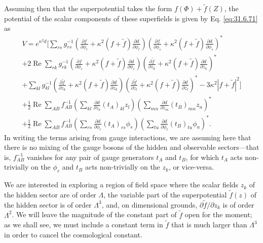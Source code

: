 Assuming then that the superpotential takes the form
\(f(\Phi)+\widetilde f(Z)\), the potential of the scalar components of these
superfields is given by Eq. \eqref{eq:31.6.71} as
\begin{multline}
  V=e^{\kappa^2d}\Biggl[
  \sum_{rs}g_{rs}^{-1}
  \left(
    \frac{\partial f}{\partial\phi_r}
    +\kappa^2(f+\widetilde f)\frac{\partial d}{\partial\phi_r}
  \right)
  \left(
    \frac{\partial f}{\partial\phi_s}
    +\kappa^2(f+\widetilde f)\frac{\partial d}{\partial\phi_s}
  \right)^*
  \\
  +2\operatorname{Re}\sum_{rk}g_{rk}^{-1}
  \left(
    \frac{\partial f}{\partial\phi_r}
    +\kappa^2(f+\widetilde f)\frac{\partial d}{\partial\phi_r}
  \right)
  \left(
    \frac{\partial\widetilde f}{\partial z_k}
    +\kappa^2(f+\widetilde f)\frac{\partial d}{\partial z_k}
  \right)^*
  \\
  +\sum_{kl}g_{kl}^{-1}
  \left(
    \frac{\partial\widetilde f}{\partial z_k}
    +\kappa^2(f+\widetilde f)\frac{\partial d}{\partial z_k}
  \right)
  \left(
    \frac{\partial\widetilde f}{\partial z_l}
    +\kappa^2(f+\widetilde f)\frac{\partial d}{\partial z_l}
  \right)^*
  -3\kappa^2|f+\widetilde f|^2
  \Biggr]
  \\
  +\frac12\operatorname{Re}\sum_{AB}f_{AB}^{-1}
  \left(
    \sum_{kl}\frac{\partial d}{\partial z_k}(t_A)_{kl}z_l
  \right)
  \left(
    \sum_{mn}\frac{\partial d}{\partial z_m}(t_B)_{mn}z_n
  \right)^*
  \\
  +\frac12\operatorname{Re}\sum_{AB}f_{AB}^{-1}
  \left(
    \sum_{rs}\frac{\partial d}{\partial\phi_r}(t_A)_{rs}\phi_s
  \right)
  \left(
    \sum_{tu}\frac{\partial d}{\partial\phi_t}(t_B)_{tu}\phi_u
  \right)^* .
  \tag{31.7.2}\label{eq:31.7.2}
\end{multline}
In writing the terms arising from gauge interactions, we are assuming here
that there is no mixing of the gauge bosons of the hidden and observable
sectors---that is, \(f_{AB}^{-1}\) vanishes for any pair of gauge generators
\(t_A\) and \(t_B\), for which \(t_A\) acts non-trivially on the \(\phi_r\)
and \(t_B\) acts non-trivially on the \(z_k\), or vice-versa.

We are interested in exploring a region of field space where the scalar
fields \(z_k\) of the hidden sector are of order \(\Lambda\), the variable
part of the superpotential \(\widetilde f(z)\) of the hidden sector is of
order \(\Lambda^3\), and, on dimensional grounds,
\(\partial\widetilde f/\partial z_k\) is of order \(\Lambda^2\). We will
leave the magnitude of the constant part of \(\widetilde f\) open for the
moment; as we shall see, we must include a constant term in
\(\widetilde f\) that is much larger than \(\Lambda^3\) in order to cancel
the cosmological constant.


